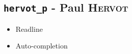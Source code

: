 \subsection{\texttt{hervot\_p} - Paul \textsc{Hervot}}

\begin{itemize}
    \item Readline
    \item Auto-completion
\end{itemize}
